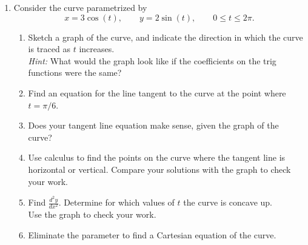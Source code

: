 \begin{enumerate}[{Problem} 1:]
\item Consider the curve parametrized by
\[
x=3\cos(t), \qquad y=2\sin(t), \qquad 0\leq t \leq 2\pi.
\]
\begin{enumerate}
\item Sketch a graph of the curve, and indicate the direction  in which the curve is traced as \(t\) increases.\\
\textit{Hint:} What would the graph look like if the coefficients on the trig functions were the same?
\item Find an equation for the line tangent to the curve at the point where \(t=\pi/6\). 
\item Does your tangent line equation make sense, given the graph of the curve?
\item Use calculus to find the points on the curve where the tangent line is horizontal or vertical. Compare your solutions with the graph to check your work.
\item Find \(\frac{d^2y}{dx^2}\). Determine for which values of \(t\) the curve is concave up.\\ Use the graph to check your work.
\item Eliminate the parameter to find a Cartesian equation of the curve.
\end{enumerate}
\vfill


\end{enumerate}


